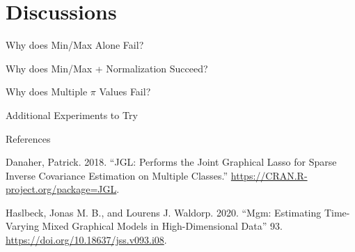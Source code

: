\documentclass[
  ignorenonframetext,
]{beamer}
\newlength{\cslhangindent}
\newlength{\cslentryspacingunit} %
\newenvironment{CSLReferences}[2] %
 {%
  \setlength{\parindent}{0pt}
  \ifodd #1
  \let\oldpar\par
  \def\par{\hangindent=\cslhangindent\oldpar}
  \fi
  \setlength{\parskip}{#2\cslentryspacingunit}
 }%
 {}
\begin{document}
\hypertarget{discussions}{%
\section{Discussions}\label{discussions}}

\begin{frame}{Why does Min/Max Alone Fail?}
\protect\hypertarget{why-does-minmax-alone-fail}{}
\end{frame}

\begin{frame}{Why does Min/Max + Normalization Succeed?}
\protect\hypertarget{why-does-minmax-normalization-succeed}{}
\end{frame}

\begin{frame}{Why does Multiple \(\pi\) Values Fail?}
\protect\hypertarget{why-does-multiple-pi-values-fail}{}
\end{frame}

\begin{frame}{Additional Experiments to Try}
\protect\hypertarget{additional-experiments-to-try}{}
\end{frame}

\begin{frame}{References}
\protect\hypertarget{references}{}
\hypertarget{refs}{}
\begin{CSLReferences}{1}{0}
\leavevmode{}%
Danaher, Patrick. 2018. {``JGL: Performs the Joint Graphical Lasso for
Sparse Inverse Covariance Estimation on Multiple Classes.''}
\url{https://CRAN.R-project.org/package=JGL}.

\leavevmode{}%
Haslbeck, Jonas M. B., and Lourens J. Waldorp. 2020.
{``{\textbraceleft}Mgm{\textbraceright}: Estimating Time-Varying Mixed
Graphical Models in High-Dimensional Data''} 93.
\url{https://doi.org/10.18637/jss.v093.i08}.

\end{CSLReferences}
\end{frame}
\end{document}
